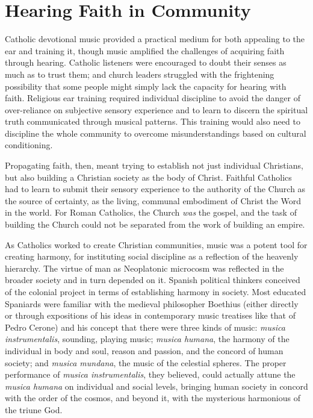 \section{Hearing Faith in Community}

Catholic devotional music provided a practical medium for both appealing to the
ear and training it, though music amplified the challenges of acquiring faith
through hearing.
Catholic listeners were encouraged to doubt their senses as much as to trust
them; and church leaders struggled with the frightening possibility that some
people might simply lack the capacity for hearing with faith.
Religious ear training required individual discipline to avoid the danger of
over-reliance on subjective sensory experience and to learn to discern the
spiritual truth communicated through musical patterns.
This training would also need to discipline the whole community to overcome
misunderstandings based on cultural conditioning.

Propagating faith, then, meant trying to establish not just individual
Christians, but also building a Christian society as the body of Christ.
Faithful Catholics had to learn to submit their sensory experience to the
authority of the Church as the source of certainty, as the living, communal
embodiment of Christ the Word in the world.
For Roman Catholics, the Church \emph{was} the gospel, and the task of building
the Church could not be separated from the work of building an empire.

As Catholics worked to create Christian communities, music was a potent tool for
creating harmony, for instituting social discipline as a reflection of the
heavenly hierarchy.%
    \Autocites{Baker:Harmony}{Irving:Colonial}{Illari:Polychoral}
The virtue of man as Neoplatonic microcosm was reflected in the broader society
and in turn depended on it.
Spanish political thinkers conceived of the colonial project in terms of
establishing harmony in society.%
    \Autocite[22--31]{Baker:Harmony}
Most educated Spaniards were familiar with the medieval philosopher Boethius
(either directly or through expositions of his ideas in contemporary music
treatises like that of Pedro Cerone) and his concept that there were three kinds
of music: \emph{musica instrumentalis}, sounding, playing music; \emph{musica
humana}, the harmony of the individual in body and soul, reason and passion, and
the concord of human society; and \emph{musica mundana}, the music of the
celestial spheres.%
    \Autocites
    [, ]{Cerone:Melopeo}
    [203--208]{Boethius:Musica}
The proper performance of \emph{musica instrumentalis}, they believed, could
actually attune the \emph{musica humana} on individual and social levels,
bringing human society in concord with the order of the cosmos, and beyond it,
with the mysterious harmonious of the triune God.

